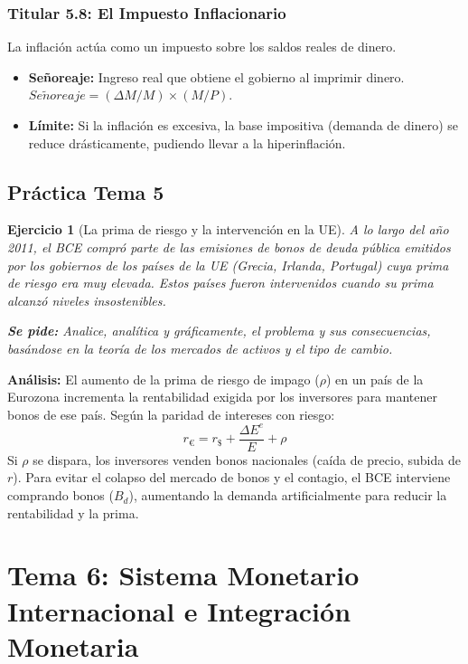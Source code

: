 \documentclass[a4paper,12pt]{report}
\theoremstyle{ejerciciostyle}
\newtheorem{ejercicio}{Ejercicio}[chapter]
\begin{document}
\subsection{Titular 5.8: El Impuesto Inflacionario}
La inflación actúa como un impuesto sobre los saldos reales de dinero.
\begin{itemize}
    \item \textbf{Señoreaje:} Ingreso real que obtiene el gobierno al imprimir dinero. $Se\tilde{n}oreaje = (\Delta M/M) \times (M/P)$.
    \item \textbf{Límite:} Si la inflación es excesiva, la base impositiva (demanda de dinero) se reduce drásticamente, pudiendo llevar a la hiperinflación.
\end{itemize}

\section{Práctica Tema 5}

\begin{ejercicio}[La prima de riesgo y la intervención en la UE]
A lo largo del año 2011, el BCE compró parte de las emisiones de bonos de deuda pública emitidos por los gobiernos de los países de la UE (Grecia, Irlanda, Portugal) cuya prima de riesgo era muy elevada. Estos países fueron intervenidos cuando su prima alcanzó niveles insostenibles.

\textbf{Se pide:} Analice, analítica y gráficamente, el problema y sus consecuencias, basándose en la teoría de los mercados de activos y el tipo de cambio.
\end{ejercicio}

\begin{solucion}
\textbf{Análisis:}
El aumento de la prima de riesgo de impago ($\rho$) en un país de la Eurozona incrementa la rentabilidad exigida por los inversores para mantener bonos de ese país.
Según la paridad de intereses con riesgo:
\[ r_{\euro} = r_{\$} + \frac{\Delta E^e}{E} + \rho \]
Si $\rho$ se dispara, los inversores venden bonos nacionales (caída de precio, subida de $r$). Para evitar el colapso del mercado de bonos y el contagio, el BCE interviene comprando bonos ($B_d$), aumentando la demanda artificialmente para reducir la rentabilidad y la prima.
\end{solucion}

\newpage

\chapter{Tema 6: Sistema Monetario Internacional e Integración Monetaria}
\end{document}
